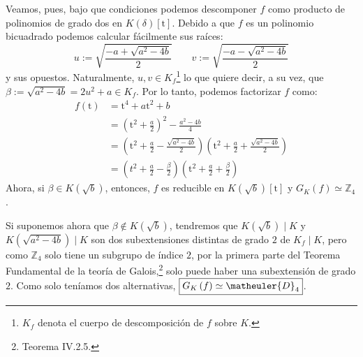 \begin{sol}
    Veamos, pues, bajo que condiciones podemos descomponer $f$ como producto de polinomios de grado dos en $K\left( \delta \right)\left[ \mathrm{t} \right]$. Debido a que $f$ es un polinomio bicuadrado podemos calcular fácilmente sus raíces:
    \[
    u := \sqrt{\frac{-a + \sqrt{a^2 - 4b}}{2}}\qquad v := \sqrt{\frac{-a - \sqrt{a^2 - 4b}}{2}}
    \]
    y sus opuestos. Naturalmente, $u,v \in K_f$\footnote{$K_f$ denota el cuerpo de descomposición de $f$ sobre $K$.} lo que quiere decir, a su vez, que $\beta := \sqrt{a^2 - 4b} = 2u^2 + a \in K_f$. Por lo tanto, podemos factorizar $f$ como:
    \begin{align*}
        f\left( \mathrm{t} \right) &= \mathrm{t}^4 + a \mathrm{t}^2 + b\\
        &= \left( \mathrm{t}^2 + \frac{a}{2} \right)^2 - \frac{a^2 - 4b}{4}\\
        &= \left( \mathrm{t}^2 + \frac{a}{2} - \frac{\sqrt{a^2 - 4b}}{2} \right) \left( \mathrm{t}^2 + \frac{a}{2} + \frac{\sqrt{a^2 - 4b}}{2} \right)\\
        &= \left( t^2 + \frac{a}{2} - \frac{\beta}{2} \right)\left( \mathrm{t}^2 + \frac{a}{2} + \frac{\beta}{2} \right)
    \end{align*}
    Ahora, si $\beta \in K\left( \sqrt{b} \right)$, entonces, $f$ es reducible en $K\left( \sqrt{b} \right)\left[ \mathrm{t} \right]$ y $\boxed{G_K\left( f \right) \simeq \mathbb{Z}_4}$.

    Si suponemos ahora que $\beta \not\in K\left( \sqrt{b} \right)$, tendremos que $K\left( \sqrt{b} \right) \mid K$ y $K\left( \sqrt{a^2 - 4b} \right) \mid K$ son dos subextensiones distintas de grado $2$ de $K_f \mid K$, pero como $\mathbb{Z}_4$ solo tiene un subgrupo de índice $2$, por la primera parte del Teorema Fundamental de la teoría de Galois,\footnote{Teorema IV.2.5\cite{cuerpos}.} solo puede haber una subextensión de grado $2$. Como solo teníamos dos alternativas, $\boxed{G_K\left( f \right) \simeq \matheuler{D}_4}$.
\end{sol}
